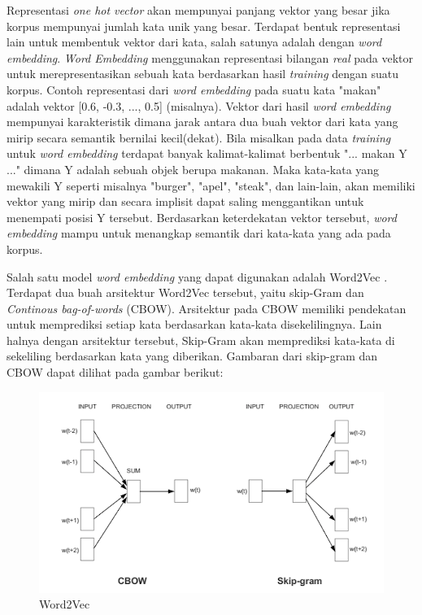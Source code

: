 Representasi \textit{one hot vector} akan mempunyai panjang vektor yang besar jika korpus mempunyai jumlah kata unik yang besar. Terdapat bentuk representasi lain untuk membentuk vektor dari kata, salah satunya adalah dengan \textit{word embedding}. \textit{Word Embedding} menggunakan representasi bilangan \textit{real} pada vektor untuk merepresentasikan sebuah kata berdasarkan hasil \textit{training} dengan suatu korpus. Contoh representasi dari \textit{word embedding} pada suatu kata "makan" adalah vektor [0.6, -0.3, ..., 0.5] (misalnya). Vektor dari hasil \textit{word embedding} mempunyai karakteristik dimana jarak antara dua buah vektor dari kata yang mirip secara semantik bernilai kecil(dekat). Bila misalkan pada data \textit{training} untuk \textit{word embedding} terdapat banyak kalimat-kalimat berbentuk "... makan Y ..." dimana Y adalah sebuah objek berupa makanan. Maka kata-kata yang mewakili Y seperti misalnya "burger", "apel", "steak", dan lain-lain, akan memiliki vektor yang mirip dan secara implisit dapat saling menggantikan untuk menempati posisi Y tersebut. Berdasarkan keterdekatan vektor tersebut, \textit{word embedding} mampu untuk menangkap semantik dari kata-kata yang ada pada korpus.

Salah satu model \textit{word embedding} yang dapat digunakan adalah Word2Vec \citep{mikolov2013distributed}. Terdapat dua buah arsitektur Word2Vec tersebut, yaitu skip-Gram dan \textit{Continous bag-of-words} (CBOW). Arsitektur pada CBOW memiliki pendekatan untuk memprediksi setiap kata berdasarkan kata-kata disekelilingnya. Lain halnya dengan arsitektur tersebut, Skip-Gram akan memprediksi kata-kata di sekeliling berdasarkan kata yang diberikan. Gambaran dari skip-gram dan CBOW dapat dilihat pada gambar berikut:

\begin{figure}
	\centering
	\includegraphics[width=1\linewidth]{adit_pics/word2vec_diagrams.png}
	\caption{Word2Vec}
	\label{fig:Word2Vec}
\end{figure}
